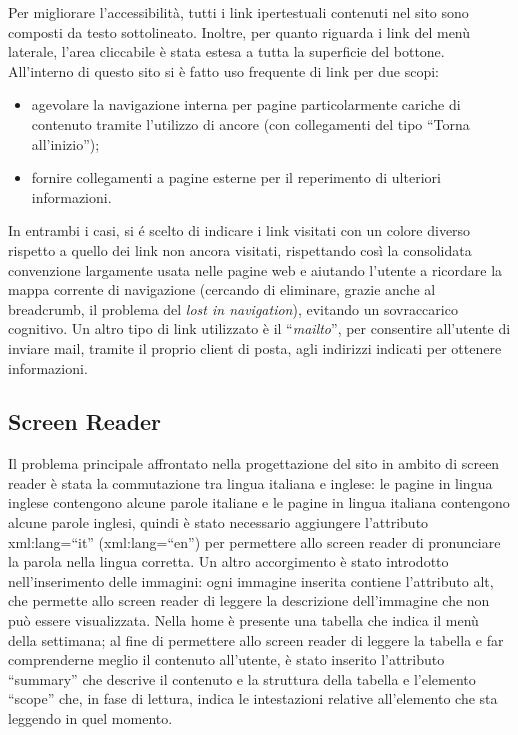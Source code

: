 \documentclass[10pt,a4paper,onecolumn]{article}
\begin{document}
Per migliorare l’accessibilità, tutti i link ipertestuali contenuti nel sito sono composti da testo sottolineato. Inoltre, per quanto riguarda i link del menù laterale, l’area cliccabile è stata estesa a tutta la superficie del bottone.
All’interno di questo sito si è fatto uso frequente di link per due scopi:
\begin{itemize}
 \item agevolare la navigazione interna per pagine particolarmente cariche di contenuto tramite l’utilizzo di ancore (con collegamenti del tipo ``Torna all’inizio'');
 \item fornire collegamenti a pagine esterne per il reperimento di ulteriori informazioni.
\end{itemize}
In entrambi i casi, si é scelto di indicare i link visitati con un colore diverso rispetto a quello dei link non ancora visitati, rispettando così la consolidata convenzione largamente usata nelle pagine web e aiutando l’utente a ricordare la mappa corrente di navigazione (cercando di eliminare, grazie anche al breadcrumb, il problema del \textit{lost in navigation}), evitando un sovraccarico cognitivo. Un altro tipo di link utilizzato è il ``\textit{mailto}'', per consentire all’utente di inviare mail, tramite il proprio client di posta, agli indirizzi indicati per ottenere informazioni. 

\subsection{Screen Reader}

Il problema principale affrontato nella progettazione del sito in ambito di screen reader è stata la commutazione tra lingua italiana e inglese: le pagine in lingua inglese contengono alcune parole italiane e le pagine in lingua italiana contengono alcune parole inglesi, quindi è stato necessario aggiungere l’attributo xml:lang=``it'' (xml:lang=``en'') per permettere allo screen reader di pronunciare la parola nella lingua corretta.
Un altro accorgimento è stato introdotto nell'inserimento delle immagini: ogni immagine inserita contiene l'attributo alt, che permette allo screen reader di leggere la descrizione dell'immagine che non può essere visualizzata.
Nella home è presente una tabella che indica il menù della settimana; al fine di permettere allo screen reader di leggere la tabella e far comprenderne meglio il contenuto all'utente, è stato inserito l'attributo ``summary'' che descrive il contenuto e la struttura della tabella e l'elemento ``scope'' che, in fase di lettura, indica le intestazioni relative all'elemento che sta leggendo in quel momento.
\end{document}
